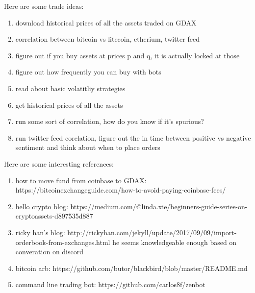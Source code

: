 Here are some trade ideas:

\begin{enumerate}
	\item download historical prices of all the assets traded on GDAX
	\item correlation between bitcoin vs {litecoin, etherium, twitter feed}
	\item figure out if you buy assets at prices p and q, it is actually locked at those 
	\item figure out how frequently you can buy with bots
	\item read about basic volatitliy strategies
	\item get historical prices of all the assets
	\item run some sort of correlation, how do you know if it's spurious?
	\item run twitter feed corelation, figure out the in time between positive vs negative
	  sentiment and think about when to place orders
\end{enumerate}

Here are some interesting references:

\begin{enumerate}
	\item how to move fund from coinbase to GDAX: https://bitcoinexchangeguide.com/how-to-avoid-paying-coinbase-fees/
	\item hello crypto blog: https://medium.com/@linda.xie/beginners-guide-series-on-cryptoassets-d897535d887
	\item ricky han's blog: http://rickyhan.com/jekyll/update/2017/09/09/import-orderbook-from-exchanges.html
		  he seems knowledgeable enough based on converation on discord
	\item bitcoin arb: https://github.com/butor/blackbird/blob/master/README.md
	\item command line trading bot: https://github.com/carlos8f/zenbot
\end{enumerate}
